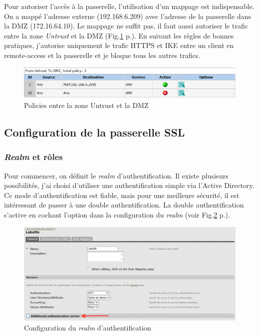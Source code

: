 Pour autoriser l'accès à la passerelle, l'utilisation d'un mappage est indispensable.
On a mappé l'adresse externe (192.168.6.209) avec l'adresse de la passerelle dans la DMZ (172.16.64.10).
Le mappage ne suffit pas, il faut aussi autoriser le trafic entre la zone \textit{Untrust} et la DMZ (Fig.\ref{fig:polUnDMZ} p.\pageref{fig:polUnDMZ}).
En suivant les règles de bonnes pratiques, j'autorise uniquement le trafic HTTPS et IKE entre un client en remote-access et la passerelle et je bloque tous les autres trafics.
\begin{figure}[ht]
	\centering
	\includegraphics[width=16cm]{juniper/Policy-Untrust-DMZ.png}
	\caption{Policies entre la zone Untrust et la DMZ}
	\label{fig:polUnDMZ}
\end{figure}

\subsection{Configuration de la passerelle  SSL}
\subsubsection{\textit{Realm} et rôles}
Pour commencer, on définit le \textit{realm} d'authentification.
Il existe plusieurs possibilités, j'ai choisi d'utiliser une authentification simple via l'Active Directory.
Ce mode d'authentification est fiable, mais pour une meilleure sécurité, il est intéressant de passer à une double authentification.
La double authentification s'active en cochant l'option dans la configuration du \textit{realm} (voir Fig.\ref{fig:confRealm} p.\pageref{fig:confRealm}).
\begin{figure}[ht]
	\centering
	\includegraphics[width=16cm]{juniper/Authserv.png}
	\caption{Configuration du \textit{realm} d'authentification}
	\label{fig:confRealm}
\end{figure}

